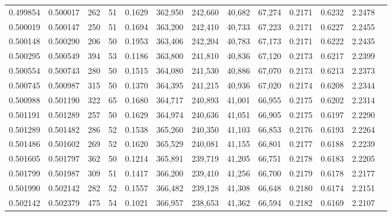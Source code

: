 \begin{tabular}{rrrrrrrrrrrrr}
0.499854 & 0.500017 &   262 &  51 &                                     0.1629 & 362,950 & 242,660 &  40,682 &  67,274 & 0.2171 & 0.6232 & 2.2478 \\
0.500019 & 0.500147 &   250 &  51 &                                     0.1694 & 363,200 & 242,410 &  40,733 &  67,223 & 0.2171 & 0.6227 & 2.2455 \\
0.500148 & 0.500290 &   206 &  50 &                                     0.1953 & 363,406 & 242,204 &  40,783 &  67,173 & 0.2171 & 0.6222 & 2.2435 \\
0.500295 & 0.500549 &   394 &  53 &                                     0.1186 & 363,800 & 241,810 &  40,836 &  67,120 & 0.2173 & 0.6217 & 2.2399 \\
0.500554 & 0.500743 &   280 &  50 &                                     0.1515 & 364,080 & 241,530 &  40,886 &  67,070 & 0.2173 & 0.6213 & 2.2373 \\
0.500745 & 0.500987 &   315 &  50 &                                     0.1370 & 364,395 & 241,215 &  40,936 &  67,020 & 0.2174 & 0.6208 & 2.2344 \\
0.500988 & 0.501190 &   322 &  65 &                                     0.1680 & 364,717 & 240,893 &  41,001 &  66,955 & 0.2175 & 0.6202 & 2.2314 \\
0.501191 & 0.501289 &   257 &  50 &                                     0.1629 & 364,974 & 240,636 &  41,051 &  66,905 & 0.2175 & 0.6197 & 2.2290 \\
0.501289 & 0.501482 &   286 &  52 &                                     0.1538 & 365,260 & 240,350 &  41,103 &  66,853 & 0.2176 & 0.6193 & 2.2264 \\
0.501486 & 0.501602 &   269 &  52 &                                     0.1620 & 365,529 & 240,081 &  41,155 &  66,801 & 0.2177 & 0.6188 & 2.2239 \\
0.501605 & 0.501797 &   362 &  50 &                                     0.1214 & 365,891 & 239,719 &  41,205 &  66,751 & 0.2178 & 0.6183 & 2.2205 \\
0.501799 & 0.501987 &   309 &  51 &                                     0.1417 & 366,200 & 239,410 &  41,256 &  66,700 & 0.2179 & 0.6178 & 2.2177 \\
0.501990 & 0.502142 &   282 &  52 &                                     0.1557 & 366,482 & 239,128 &  41,308 &  66,648 & 0.2180 & 0.6174 & 2.2151 \\
0.502142 & 0.502379 &   475 &  54 &                                     0.1021 & 366,957 & 238,653 &  41,362 &  66,594 & 0.2182 & 0.6169 & 2.2107 \\

\end{tabular}
